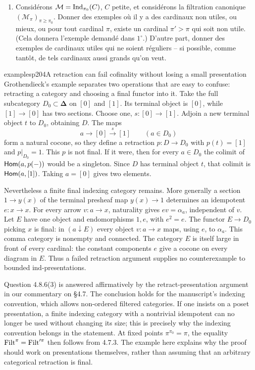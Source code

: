\begin{enumerate}
\item[4)] Considérons $\mathcal{M}=\operatorname{Ind}_{\pi_0}(C)$, $C$ petite, et considérons la filtration canonique $(\mathcal{M}_\pi)_{\pi\geqslant\pi_0}$. Donner des exemples où il y a des cardinaux non utiles, ou mieux, ou pour tout cardinal $\pi$, existe un cardinal $\pi'>\pi$ qui soit non utile. (Cela donnera l'exemple demandé dans $1^\circ$.) D'autre part, donner des exemples de cardinaux utiles qui ne soient réguliers -- si possible, comme tantôt, de tels cardinaux aussi grands qu'on veut.
\end{enumerate}

\begin{dcomment}{examples}{p204}{A retraction can fail cofinality without losing a small presentation}
Grothendieck's example separates two operations that are easy to confuse: retracting a category and choosing a final functor into it. Take the full subcategory $D_0\subset\boldsymbol\Delta$ on $[0]$ and $[1]$. Its terminal object is $[0]$, while $[1]\to[0]$ has two sections. Choose one, $s:[0]\to[1]$. Adjoin a new terminal object $t$ to $D_0$, obtaining $D$. The maps
\[
 a\longrightarrow[0]\xrightarrow{s}[1]
 \qquad(a\in D_0)
\]
form a natural cocone, so they define a retraction $p:D\to D_0$ with $p(t)=[1]$ and $p|_{D_0}=1$. This $p$ is not final. If it were, then for every $a\in D_0$ the colimit of $\mathsf{Hom}(a,p(-))$ would be a singleton. Since $D$ has terminal object $t$, that colimit is $\mathsf{Hom}(a,[1])$. Taking $a=[0]$ gives two elements.

Nevertheless a finite final indexing category remains. More generally a section $1\to y(x)$ of the terminal presheaf map $y(x)\to1$ determines an idempotent $e:x\to x$. For every arrow $v:a\to x$, naturality gives $ev=\alpha_a$, independent of $v$. Let $E$ have one object and endomorphisms $1,e$, with $e^2=e$. The functor $E\to D_0$ picking $x$ is final: in $(a\downarrow E)$ every object $v:a\to x$ maps, using $e$, to $\alpha_a$. This comma category is nonempty and connected. The category $E$ is itself large in front of every cardinal: the constant components $e$ give a cocone on every diagram in $E$. Thus a failed retraction argument supplies no counterexample to bounded ind-presentations.

Question 4.8.6(3) is answered affirmatively by the retract-presentation argument in our commentary on \S4.7. The conclusion holds for the manuscript's indexing convention, which allows non-ordered filtered categories. If one insists on a poset presentation, a finite indexing category with a nontrivial idempotent can no longer be used without changing its size; this is precisely why the indexing convention belongs in the statement. At fixed points $\pi^{\pi_0}=\pi$, the equality $\mathrm{Filt}^\pi=\mathrm{Filt}'^\pi$ then follows from 4.7.3. The example here explains why the proof should work on presentations themselves, rather than assuming that an arbitrary categorical retraction is final.
\end{dcomment}


